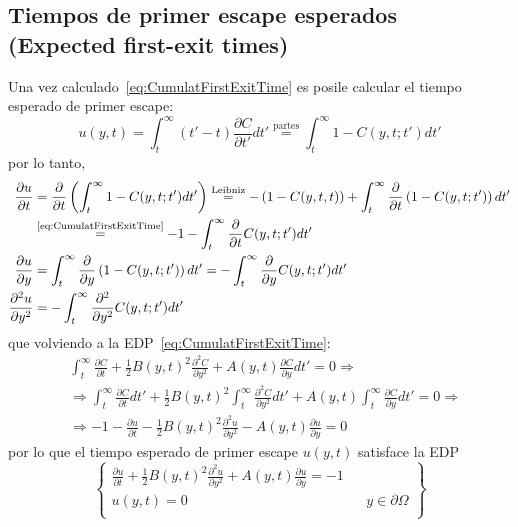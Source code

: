 \subsection{Tiempos de primer escape esperados (Expected first-exit times)}\label{sec:ExpectedFirstExitTimes}
Una vez calculado~\eqref{eq:CumulatFirstExitTime} es posile calcular el tiempo esperado de primer escape:
\[
    u(y, t) = \int_t^\infty (t' - t) \frac{\partial C}{\partial t'} dt' \overset{\text{partes}}{=} \int_t^\infty 1 - C(y, t; t') dt'
\]
por lo tanto,
\begin{align*}
    \frac{\partial u}{\partial t}  &= \frac{\partial}{\partial t} \left(\int_t^\infty 1 - C(y, t; t') dt' \right) \overset{\text{Leibniz}}{=} -\left(1-C(y, t, t)\right) + \int_t^\infty \frac{\partial}{\partial t}\left(1 - C(y, t; t')\right) dt' \\
    &\overset{\text{\eqref{eq:CumulatFirstExitTime}}}{=} -1 - \int_t^\infty \frac{\partial}{\partial t} C(y, t; t') dt' \\
    \frac{\partial u}{\partial y}  &= \int_t^\infty \frac{\partial}{\partial y}\left(1 - C(y, t; t')\right) dt' = - \int_t^\infty \frac{\partial}{\partial y} C(y, t; t') dt' \\
    \frac{\partial^2 u}{\partial y^2}  &= - \int_t^\infty \frac{\partial^2}{\partial y^2} C(y, t; t') dt' \\
\end{align*}
que volviendo a la EDP~\eqref{eq:CumulatFirstExitTime}:
\begin{align*}
    &\int_t^\infty\frac{\partial C}{\partial t} + \frac{1}{2} B(y, t)^2 \frac{\partial^2 C}{\partial y^2} + A(y, t) \frac{\partial C}{\partial y} dt' = 0 \Rightarrow \\
    &\Rightarrow \int_t^\infty\frac{\partial C}{\partial t} dt' + \frac{1}{2} B(y, t)^2 \int_t^\infty \frac{\partial^2 C}{\partial y^2} dt' + A(y, t) \int_t^\infty \frac{\partial C}{\partial y} dt' = 0 \Rightarrow \\
    &\Rightarrow -1 - \frac{\partial u}{\partial t} - \frac{1}{2} B(y, t)^2 \frac{\partial^2 u}{\partial y^2} - A(y, t) \frac{\partial u}{\partial y} = 0
\end{align*}
por lo que el tiempo esperado de primer escape $u(y, t)$ satisface la EDP
\[
    \boxed{
        \left\{
        \begin{aligned}
            \frac{\partial u}{\partial t} + \frac{1}{2} B(y, t)^2 \frac{\partial^2 u}{\partial y^2} + A(y, t) \frac{\partial u}{\partial y} = -1\\
            u(y, t) = 0 && y \in \partial\Omega \\
        \end{aligned}
        \right\}
    }
\]
